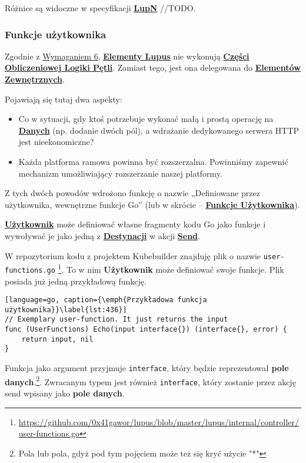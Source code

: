 Różnice są widoczne w specyfikacji \hyperlink{def:lupn}{\textbf{LupN}} //TODO.

\subsubsection{Funkcje użytkownika}\label{sec:funkcje-uzytkownika}

Zgodnie z \hyperref[req:6]{Wymaganiem 6}, \hyperlink{def:element-lupus}{\textbf{Elementy Lupus}} nie wykonują \hyperlink{def:czesc-obliczeniowa}{\textbf{Części Obliczeniowej Logiki Pętli}}. Zamiast tego, jest ona delegowana do \hyperlink{def:element-zewnetrzny}{\textbf{Elementów Zewnętrznych}}.

Pojawiają się tutaj dwa aspekty:
\begin{itemize}
    \item Co w sytuacji, gdy ktoś potrzebuje wykonać małą i prostą operację na \hyperlink{def:dane}{\textbf{Danych}} (np. dodanie dwóch pól), a wdrażanie dedykowanego serwera HTTP jest nieekonomiczne?
    \item Każda platforma ramowa powinna być rozszerzalna. Powinniśmy zapewnić mechanizm umożliwiający rozszerzanie naszej platformy.
\end{itemize}

Z tych dwóch powodów wdrożono funkcję o nazwie „Definiowane przez użytkownika, wewnętrzne funkcje Go” (lub w skrócie – \hyperlink{def:funkcje-uzytkownika}{\textbf{Funkcje Użytkownika}}).

\hyperlink{def:uzytkownik}{\textbf{Użytkownik}} może definiować własne fragmenty kodu Go jako funkcje i wywoływać je jako jedną z \hyperlink{def:destynacja}{\textbf{Destynacji}} w akcji \hyperlink{def:akcja}{\textbf{Send}}.

W repozytorium kodu z projektem Kubebuilder znajduję plik o nazwie \texttt{user-functions.go} \footnote{\url{https://github.com/0x41gawor/lupus/blob/master/lupus/internal/controller/user-functions.go}}. To w nim \textbf{Użytkownik} może definiować swoje funkcje. Plik posiada już jedną przykładową funkcję.

\begin{lstlisting}[language=go, caption={\emph{Przykładowa funkcja użytkownika}}\label{lst:436}]
// Exemplary user-function. It just returns the input
func (UserFunctions) Echo(input interface{}) (interface{}, error) {
	return input, nil
}
\end{lstlisting}

Funkcja jako argument przyjmuje \texttt{interface{}}, który będzie reprezentował \textbf{pole danych}.\footnote{Pola lub pola, gdyż pod tym pojęciem może też się kryć użycie "*"}. Zwracanym typem jest również \texttt{interface{}}, który zostanie przez akcję send wpisany jako \textbf{pole danych}.

